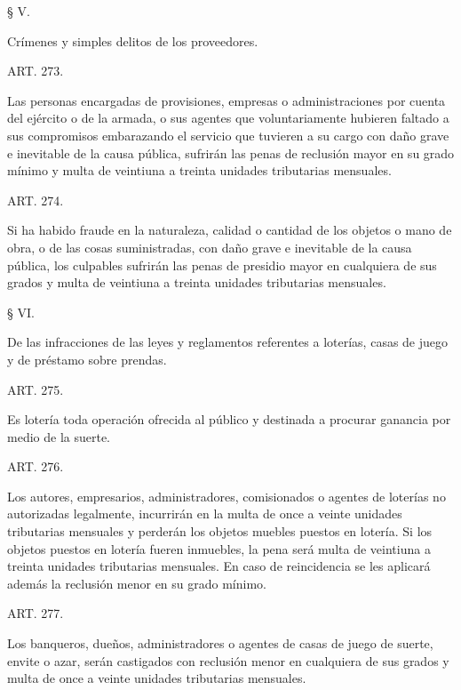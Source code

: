     § V.

    Crímenes y simples delitos de los proveedores.





    ART. 273.

    Las personas encargadas de provisiones, empresas o administraciones por cuenta del ejército o de la armada, o sus agentes que voluntariamente hubieren faltado a sus compromisos embarazando el servicio que tuvieren a su cargo con daño grave e inevitable de la causa pública, sufrirán las penas de reclusión mayor en su grado mínimo y multa de veintiuna a treinta unidades tributarias mensuales.






    ART. 274.

    Si ha habido fraude en la naturaleza, calidad o cantidad de los objetos o mano de obra, o de las cosas suministradas, con daño grave e inevitable de la causa pública, los culpables sufrirán las penas de presidio mayor en cualquiera de sus grados y multa de veintiuna a treinta unidades tributarias mensuales.






    § VI.

    De las infracciones de las leyes y reglamentos referentes a loterías, casas de juego y de préstamo sobre prendas.





    ART. 275.

    Es lotería toda operación ofrecida al público y destinada a procurar ganancia por medio de la suerte.


    ART. 276.

    Los autores, empresarios, administradores, comisionados o agentes de loterías no autorizadas legalmente, incurrirán en la multa de once a veinte unidades tributarias mensuales y perderán los objetos muebles puestos en lotería.
    Si los objetos puestos en lotería fueren inmuebles, la pena será multa de veintiuna a treinta unidades tributarias mensuales.
    En caso de reincidencia se les aplicará además la reclusión menor en su grado mínimo.







    ART. 277.

    Los banqueros, dueños, administradores o agentes de casas de juego de suerte, envite o azar, serán castigados con reclusión menor en cualquiera de sus grados y multa de once a veinte unidades tributarias mensuales.








